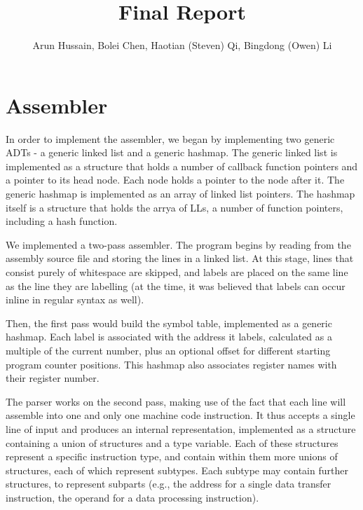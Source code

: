 \documentclass[11pt]{article}
\begin{document}
\title{Final Report}
\author{Arun Hussain, Bolei Chen, Haotian (Steven) Qi, Bingdong (Owen) Li}

\maketitle

\section{Assembler}

In order to implement the assembler, we began by implementing two generic ADTs - a generic linked list and a generic hashmap. The generic linked list is implemented as a structure that holds a number of callback function pointers and a pointer to its head node. Each node holds a pointer to the node after it. The generic hashmap is implemented as an array of linked list pointers. The hashmap itself is a structure that holds the arrya of LLs, a number of function pointers, including a hash function.

We implemented a two-pass assembler. The program begins by reading from the assembly source file and storing the lines in a linked list. At this stage, lines that consist purely of whitespace are skipped, and labels are placed on the same line as the line they are labelling (at the time, it was believed that labels can occur inline in regular syntax as well).

Then, the first pass would build the symbol table, implemented as a generic hashmap. Each label is associated with the address it labels, calculated as a multiple of the current number, plus an optional offset for different starting program counter positions. This hashmap also associates register names with their register number.

The parser works on the second pass, making use of the fact that each line will assemble into one and only one machine code instruction. It thus accepts a single line of input and produces an internal representation, implemented as a structure containing a union of structures and a type variable. Each of these structures represent a specific instruction type, and contain within them more unions of structures, each of which represent subtypes. Each subtype may contain further structures, to represent subparts (e.g., the address for a single data transfer instruction, the operand for a data processing instruction).
\end{document}
